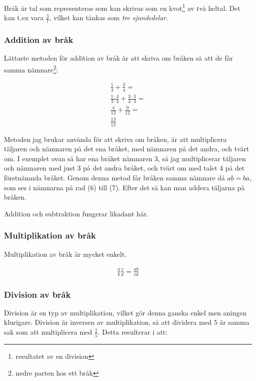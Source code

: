 Bråk är tal som representeras som kan skrivas som en kvot\footnote{resultatet av en division} av två heltal. Det kan t.ex vara $\frac{3}{7}$, vilket kan tänkas som  \textit{tre sjundedelar}.

\subsubsection{Addition av bråk}
\label{Addition av bråk}
Lättaste metoden för addition av bråk är att skriva om bråken så att de får samma nämnare\footnote{nedre parten hos ett bråk}:

\begin{align}
	\frac{1}{3} + \frac{3}{4} = \\
	\frac{1\cdot 4}{3\cdot 4} + \frac{3\cdot 3}{4\cdot 3} = \\
	\frac{4}{12} + \frac{9}{12} = \\
	\frac{13}{12}
\end{align}

Metoden jag brukar använda för att skriva om bråken, är att multiplicera täljaren och nämnaren på det ena bråket, med nämnaren på det andra, och tvärt om. I exemplet ovan så har ena bråket nämnaren 3, så jag multiplicerar täljaren och nämnaren med just 3 på det andra bråket, och tvärt om med talet 4 på det förstnämnda bråket. Genom denna metod får bråken samma nämnare då $ab = ba$, som ses i nämnarna på rad (6) till (7). Efter det så kan man addera täljarna på bråken.

Addition och subtraktion fungerar likadant här.

\subsubsection{Multiplikation av bråk}

Multiplikation av bråk är mycket enkelt.

\begin{align}
	\frac{a}{b} \frac{c}{d} = \frac{ab}{cd}
\end{align}

\subsubsection{Division av bråk}
\label{Division av bråk}

Division är en typ av multiplikation, vilket gör denna ganska enkel men aningen klurigare. Division är inversen av multiplikation, så att dividera med $5$ är samma sak som att multiplicera med $\frac{1}{5}$. Detta resulterar i att:

